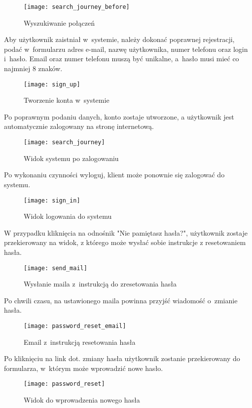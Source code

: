\documentclass[eng,archivemode]{mgr}
\begin{document}
\begin{figure}[H]
	\centering
	\texttt{[image: search\_journey\_before]}
	\caption{Wyszukiwanie połączeń}
	\label{fig:search_journey_before}
\end{figure}

Aby użytkownik zaistniał w~systemie, należy dokonać poprawnej rejestracji, podać w~formularzu adres e-mail, nazwę użytkownika, numer telefonu oraz login i~hasło. Email oraz numer telefonu muszą być unikalne, a~hasło musi mieć co najmniej 8 znaków.

\begin{figure}[H]
	\centering
	\texttt{[image: sign\_up]}
	\caption{Tworzenie konta w~systemie}
	\label{fig:sign_up}
\end{figure}

Po poprawnym podaniu danych, konto zostaje utworzone, a użytkownik jest automatycznie zalogowany na stronę internetową.
\begin{figure}[H]
	\centering
	\texttt{[image: search\_journey]}
	\caption{Widok systemu po zalogowaniu}
	\label{fig:search_user}
\end{figure}
Po wykonaniu czynności wyloguj, klient może ponownie się zalogować do systemu.
\begin{figure}[H]
	\centering
	\texttt{[image: sign\_in]}
	\caption{Widok logowania do systemu}
	\label{fig:sign_in}
\end{figure}

W przypadku kliknięcia na odnośnik "Nie pamiętasz hasła?", użytkownik zostaje przekierowany na widok, z którego może wysłać sobie instrukcje z resetowaniem hasła.
\begin{figure}[H]
	\centering
	\texttt{[image: send\_mail]}
	\caption{Wysłanie maila z~instrukcją do zresetowania hasła}
	\label{fig:send_mail}
\end{figure}
Po chwili czasu, na ustawionego maila powinna przyjść wiadomość o~zmianie hasła.
\begin{figure}[H]
	\centering
	\texttt{[image: password\_reset\_email]}
	\caption{Email z~instrukcją resetowania hasła}
	\label{fig:password_reset_email}
\end{figure}
Po kliknięciu na link dot. zmiany hasła użytkownik zostanie przekierowany do formularza, w~którym może wprowadzić nowe hasło.
\begin{figure}[H]
	\centering
	\texttt{[image: password\_reset]}
	\caption{Widok do wprowadzenia nowego hasła}
	\label{fig:password_reset}
\end{figure}
\end{document}
